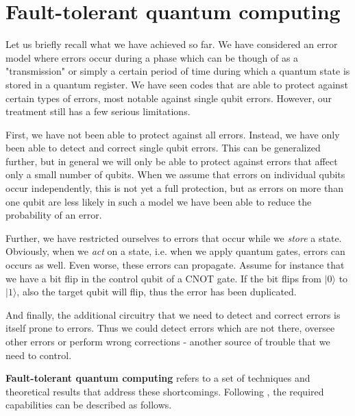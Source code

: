 \documentclass[a4paper, draft]{article}
\theoremstyle{own}
\theoremstyle{remark}
\begin{document}
\section{Fault-tolerant quantum computing}

Let us briefly recall what we have achieved so far. We have considered an error model where errors occur during a phase which can be though of as a "transmission" or simply a certain period of time during which a quantum state is stored in a quantum register. We have seen codes that are able to protect against certain types of errors, most notable against single qubit errors. However, our treatment still has a few serious limitations.

First, we have not been able to protect against all errors. Instead, we have only been able to detect and correct single qubit errors. This can be generalized further, but in general we will only be able to protect against errors that affect only a small number of qubits. When we assume that errors on individual qubits occur independently, this is not yet a full protection, but as errors on more than one qubit are less likely in such a model we have been able to reduce the probability of an error. 

Further, we have restricted ourselves to errors that occur while we \emph{store} a state. Obviously, when we \emph{act} on a state, i.e. when we apply quantum gates, errors can occurs as well. Even worse, these errors can propagate. Assume for instance that we have a bit flip in the control qubit of a CNOT gate. If the bit flips from $|0 \rangle$ to $|1 \rangle$, also the target qubit will flip, thus the error has been duplicated. 

And finally, the additional circuitry that we need to detect and correct errors is itself prone to errors. Thus we could detect errors which are not there, oversee other errors or perform wrong corrections - another source of trouble that we need to control.

{\bf Fault-tolerant quantum computing} refers to a set of techniques and theoretical results that address these shortcomings. Following \cite{Kempe}, the required capabilities can be described as follows.
\end{document}

